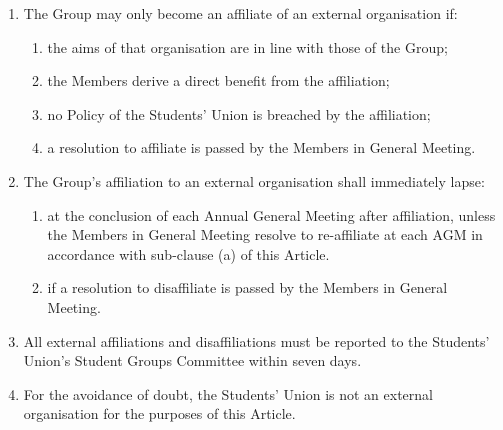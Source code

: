 \documentclass[12pt]{constitution}
\begin{document}

\label{article:affiliation-external-organisations}

\begin{enumerate}
    \item The Group may only become an affiliate of an external organisation if:
    \begin{enumerate}
        \item the aims of that organisation are in line with those of the Group;
        \item the Members derive a direct benefit from the affiliation;
        \item no Policy of the Students' Union is breached by the affiliation;
        \item a resolution to affiliate is passed by the Members in General Meeting.
    \end{enumerate}

    \item The Group's affiliation to an external organisation shall immediately lapse:
    \begin{enumerate}
        \item at the conclusion of each Annual General Meeting after affiliation, unless the Members in General Meeting resolve to re-affiliate at each AGM in accordance with sub-clause (a) of this Article.
        \item if a resolution to disaffiliate is passed by the Members in General Meeting.
    \end{enumerate}

    \item All external affiliations and disaffiliations must be reported to the Students' Union's Student Groups Committee within seven days.
    \item For the avoidance of doubt, the Students' Union is not an external organisation for the purposes of this Article.
\end{enumerate}


\label{article:amendment-constitution}
\end{document}
